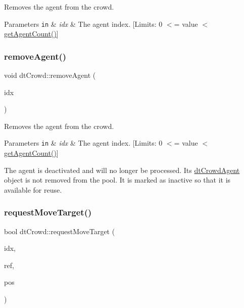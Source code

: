 Removes the agent from the crowd. 
\begin{DoxyParams}[1]{Parameters}
\mbox{\tt in}  & {\em idx} & The agent index. \mbox{[}Limits\+: 0 $<$= value $<$ \hyperlink{classdtCrowd_a87dc2372038ee12d9043a65737880b78}{get\+Agent\+Count()}\mbox{]} \\
\hline
\end{DoxyParams}
\mbox{\label{classdtCrowd_ae958ada7790a718a2887114264010f62}} 
\subsubsection{\texorpdfstring{remove\+Agent()}{removeAgent()}\hspace{0.1cm}{\footnotesize\ttfamily [2/2]}}
{\footnotesize\ttfamily void dt\+Crowd\+::remove\+Agent (\begin{DoxyParamCaption}\item[{const int}]{idx }\end{DoxyParamCaption})}

Removes the agent from the crowd. 
\begin{DoxyParams}[1]{Parameters}
\mbox{\tt in}  & {\em idx} & The agent index. \mbox{[}Limits\+: 0 $<$= value $<$ \hyperlink{classdtCrowd_a87dc2372038ee12d9043a65737880b78}{get\+Agent\+Count()}\mbox{]}\\
\hline
\end{DoxyParams}
\begin{DoxyParagraph}{}

\end{DoxyParagraph}
The agent is deactivated and will no longer be processed. Its \hyperlink{structdtCrowdAgent}{dt\+Crowd\+Agent} object is not removed from the pool. It is marked as inactive so that it is available for reuse. \mbox{\label{classdtCrowd_aa30c34a65535118989ccd86542e96797}} 
\subsubsection{\texorpdfstring{request\+Move\+Target()}{requestMoveTarget()}\hspace{0.1cm}{\footnotesize\ttfamily [1/2]}}
{\footnotesize\ttfamily bool dt\+Crowd\+::request\+Move\+Target (\begin{DoxyParamCaption}\item[{const int}]{idx,  }\item[{\hyperlink{group__detour_gab4e0b2257a670c1a800057999612b466}{dt\+Poly\+Ref}}]{ref,  }\item[{const float $\ast$}]{pos }\end{DoxyParamCaption})}

